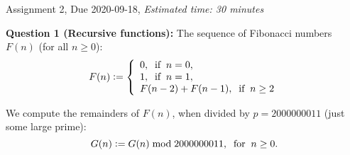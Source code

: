 \documentclass[11pt]{article}
\begin{document}
\thispagestyle{empty}

\twocolumn


\begin{center}
{\Large Assignment 2, Due 2020-09-18},
{\em Estimated time: 30 minutes}
\end{center}

\vspace{10pt}
{\bf Question 1 (Recursive functions):} The sequence of Fibonacci numbers $F(n)$ (for all $n \geq 0$): 
$$F(n) \vcentcolon= \left\{ \begin{array}{l}
0,\;\;\mbox{if}\;\;n = 0,\\
1,\;\;\mbox{if}\;\;n = 1,\\
F(n-2)+F(n-1),\;\;\mbox{if}\;\;n \geq 2\\
\end{array} \right.$$

We compute the remainders of $F(n)$, when 
divided by $p = 2000000011$ (just some large prime):
\begin{equation}
\label{function-g}
G(n) \vcentcolon= G(n) \bmod 2000000011,\;\;\mbox{for}\;\;n \geq 0.
\end{equation}
\end{document}
